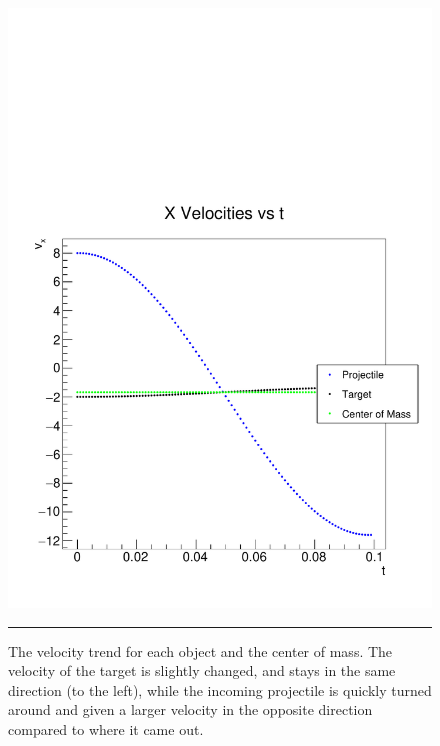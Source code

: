 \documentclass[aps,prl,floatfix,preprint,nofootinbib]{revtex4}
\begin{document}
\begin{figure}[h!]
  \includegraphics[width=.45\textwidth]{plots/out_c7/vx_vs_t.pdf}
                  {\par\nobreak\rule[9pt]{35em}{0.5pt}\vspace{-5mm}}
                  \caption{The velocity trend for each object and the center of mass. The velocity of the target is slightly changed, and stays in the same direction (to the left), while the incoming projectile is quickly turned around and given a larger velocity in the opposite direction compared to where it came out.}
                  \label{fig:vx_c7}
\end{figure}
\end{document}
